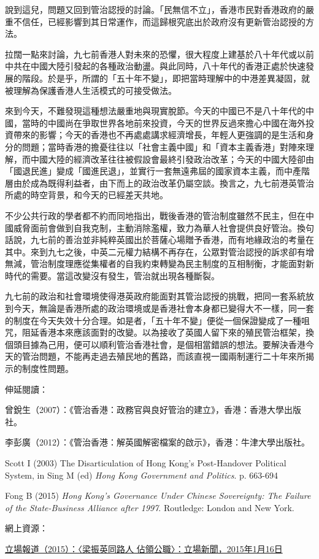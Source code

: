 說到這兒，問題又回到管治認授的討論。「民無信不立」，香港市民對香港政府的嚴重不信任，已經影響到其日常運作，而這歸根究底出於政府沒有更新管治認授的方法。

拉闊一點來討論，九七前香港人對未來的恐懼，很大程度上建基於八十年代或以前中共在中國大陸引發起的各種政治動盪。與此同時，八十年代的香港正處於快速發展的階段。於是乎，所謂的「五十年不變」，即把當時理解中的中港差異凝固，就被理解為保護香港人生活模式的可接受做法。

來到今天，不難發現這種想法嚴重地與現實脫節。今天的中國已不是八十年代的中國，當時的中國尚在爭取世界各地前來投資，今天的世界反過來擔心中國在海外投資帶來的影響；今天的香港也不再處處講求經濟增長，年輕人更強調的是生活和身分的問題；當時香港的擔憂往往以「社會主義中國」和「資本主義香港」對陣來理解，而中國大陸的經濟改革往往被假設會最終引發政治改革；今天的中國大陸卻由「國退民進」變成「國進民退」，並實行一套無遠弗屆的國家資本主義，而中產階層由於成為既得利益者，由下而上的政治改革仍屬空談。換言之，九七前港英管治所處的時空背景，和今天的已經差天共地。

不少公共行政的學者都不約而同地指出，戰後香港的管治制度雖然不民主，但在中國威脅面前會做到自我克制，主動消除濫權，致力為華人社會提供良好管治。換句話說，九七前的善治並非純粹英國出於菩薩心場贈予香港，而有地緣政治的考量在其中。來到九七之後，中英二元權力結構不再存在，公眾對管治認授的訴求卻有增無減，管治制度理應從集權者的自我約束轉變為民主制度的互相制衡，才能面對新時代的需要。當這改變沒有發生，管治就出現各種斷裂。

九七前的政治和社會環境使得港英政府能面對其管治認授的挑戰，把同一套系統放到今天，無論是香港所處的政治環境或是香港社會本身都已變得大不一樣，同一套的制度在今天失效十分合理。如是者，「五十年不變」便從一個保證變成了一種咀咒，阻延香港本來應該面對的改變。以為接收了英國人留下來的殖民管治框架，換個頭目據為己用，便可以順利管治香港社會，是個相當錯誤的想法。要解決香港今天的管治問題，不能再走過去殖民地的舊路，而該直視一國兩制運行二十年來所揭示的制度性問題。



伸延閱讀：

曾銳生（2007）：《管治香港：政務官與良好管治的建立》，香港：香港大學出版社。

李彭廣（2012）：《管治香港：解英國解密檔案的啟示》，香港：牛津大學出版社。

Scott I (2003) The Disarticulation of Hong Kong’s Post-Handover Political System, in Sing M (ed) \textit{Hong Kong Government and Politics}. p. 663-694

Fong B (2015) \textit{Hong Kong’s Governance Under Chinese Sovereignty: The Failure of the State-Business Alliance after 1997}. Routledge: London and New York.

網上資源：

\href{https://thestandnews.com/politics/梁振英同路人-佔領公職/ }{立場報道（2015）：〈梁振英同路人 佔領公職〉：立場新聞，2015年1月16日}